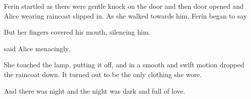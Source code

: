 Ferin startled as there were gentle knock on the door and then door opened and Alice wearing raincoat slipped in. As she walked towards him, Ferin began to say


But her fingers covered his mouth, silencing him.

 said Alice menacingly, 

She touched the lamp, putting it off, and in a smooth and swift motion dropped the raincoat down. It turned out to be the only clothing she wore.

And there was night and the night was dark and full of love.
